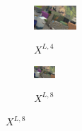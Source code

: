 \documentclass[10pt]{article}
\begin{document}
\begin{figure}[t]
{\begin{subfigure}[b]{0.28\textwidth}
        \includegraphics[width=\textwidth]{paper/latex/figures/imL_2.png}\\
        \vspace{-15pt}                      
        \caption{$X^{L,4}$}
    \end{subfigure} 
    \hspace{0.001cm} 
    \begin{subfigure}[b]{0.28\textwidth}
        \includegraphics[width=\textwidth]{paper/latex/figures/imL_3.png}\\
        \vspace{-15pt}     
        \caption{$X^{L,8}$}
    \end{subfigure}         
}
\centering
{}
\end{figure}
\end{document}
